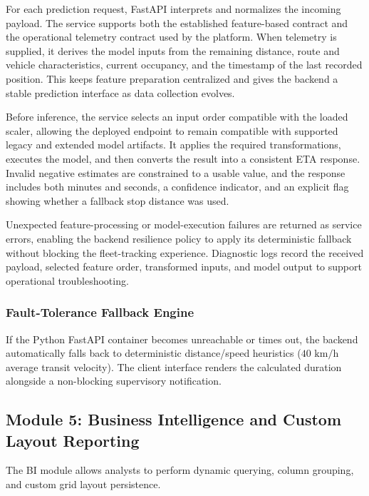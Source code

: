 For each prediction request, FastAPI interprets and normalizes the incoming payload. The service supports both the established feature-based contract and the operational telemetry contract used by the platform. When telemetry is supplied, it derives the model inputs from the remaining distance, route and vehicle characteristics, current occupancy, and the timestamp of the last recorded position. This keeps feature preparation centralized and gives the backend a stable prediction interface as data collection evolves.

Before inference, the service selects an input order compatible with the loaded scaler, allowing the deployed endpoint to remain compatible with supported legacy and extended model artifacts. It applies the required transformations, executes the model, and then converts the result into a consistent ETA response. Invalid negative estimates are constrained to a usable value, and the response includes both minutes and seconds, a confidence indicator, and an explicit flag showing whether a fallback stop distance was used.

Unexpected feature-processing or model-execution failures are returned as service errors, enabling the backend resilience policy to apply its deterministic fallback without blocking the fleet-tracking experience. Diagnostic logs record the received payload, selected feature order, transformed inputs, and model output to support operational troubleshooting.

\subsubsection{Fault-Tolerance Fallback Engine}
If the Python FastAPI container becomes unreachable or times out, the backend automatically falls back to deterministic distance/speed heuristics ($40\text{ km/h}$ average transit velocity). The client interface renders the calculated duration alongside a non-blocking supervisory notification.

\subsection{Module 5: Business Intelligence and Custom Layout Reporting}
\label{sec:impl_bi_reporting}

The BI module allows analysts to perform dynamic querying, column grouping, and custom grid layout persistence.

